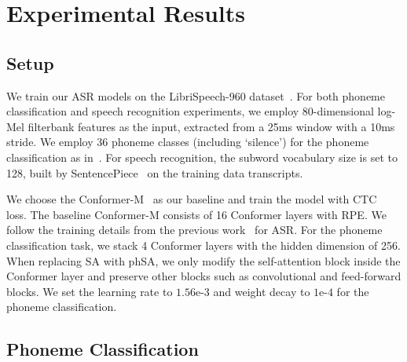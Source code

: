 \section{Experimental Results}\label{sec:experiment}


\subsection{Setup}\label{ssec:setup}

We train our ASR models on the LibriSpeech-960 dataset~\cite{librispeech}.
For both phoneme classification and speech recognition experiments, we employ 80-dimensional log-Mel filterbank features as the input, extracted from a 25ms window with a 10ms stride.
We employ 36 phoneme classes (including `silence') for the phoneme classification as in~\cite{understanding}.
For speech recognition, the subword vocabulary size is set to 128, built by SentencePiece~\cite{sentencepiece} on the training data transcripts.

We choose the Conformer-M~\cite{conformer} as our baseline and train the model with CTC~\cite{ctc} loss.
The baseline Conformer-M consists of 16 Conformer layers with RPE.
We follow the training details from the previous work~\cite{understanding} for ASR.
For the phoneme classification task, we stack 4 Conformer layers with the hidden dimension of 256.
When replacing SA with phSA, we only modify the self-attention block inside the Conformer layer and preserve other blocks such as convolutional and feed-forward blocks.
We set the learning rate to $1.56\text{e-3}$ and weight decay to $1\text{e-4}$ for the phoneme classification.


\subsection{Phoneme Classification}\label{ssec:phoneme}

